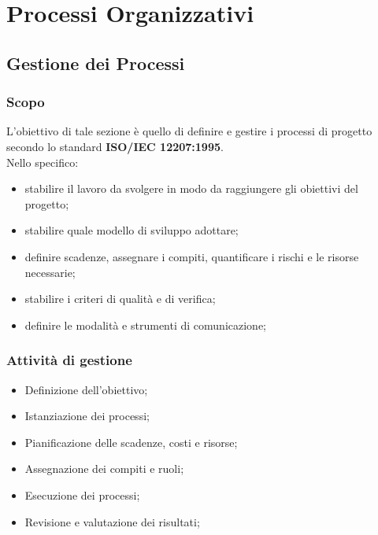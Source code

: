 \section{Processi Organizzativi}
    \subsection{Gestione dei Processi}
        \subsubsection{Scopo}
            L'obiettivo di tale sezione è quello di definire e gestire i processi di progetto secondo lo standard \textbf{ISO/IEC 12207:1995}. \\
            Nello specifico:
            \begin{itemize}
                \item stabilire il lavoro da svolgere in modo da raggiungere gli obiettivi del progetto;
                \item stabilire quale modello di sviluppo adottare;
                \item definire scadenze, assegnare i compiti, quantificare i rischi e le risorse necessarie;
                \item stabilire i criteri di qualità e di verifica;
                \item definire le modalità e strumenti di comunicazione;
            \end{itemize}

        \subsubsection{Attività di gestione}
            \begin{itemize}
                \item Definizione dell'obiettivo;
                \item Istanziazione dei processi;
                \item Pianificazione delle scadenze, costi e risorse;
                \item Assegnazione dei compiti e ruoli;
                \item Esecuzione dei processi;
                \item Revisione e valutazione dei risultati;
            \end{itemize}

